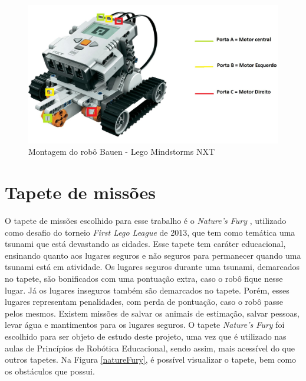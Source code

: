 \FloatBarrier
\begin{figure}[!h]
\centering
\includegraphics[keepaspectratio=true,scale=0.25]{figuras/bauen.jpg}
\caption{Montagem do robô Bauen - Lego Mindstorms NXT}
\label{bauen}
\end{figure}


\section{Tapete de missões} \label{tapeteDeMissoes}
O tapete de missões escolhido para esse trabalho é o \textit{Nature's Fury} \cite{challengeFury}, utilizado como desafio do torneio \textit{First Lego League} de 2013, que tem como temática uma tsunami que está devastando as cidades. Esse tapete tem caráter educacional, ensinando quanto aos lugares seguros e não seguros para permanecer quando uma tsunami está em atividade. Os lugares seguros durante uma tsunami, demarcados no tapete, são bonificados com uma pontuação extra, caso o robô fique nesse lugar. Já os lugares inseguros também são demarcados no tapete. Porém, esses lugares representam penalidades, com perda de pontuação, caso o robô passe pelos mesmos. Existem missões de salvar os animais de estimação, salvar pessoas, levar água e mantimentos para os lugares seguros.
O tapete \textit{Nature's Fury} foi escolhido para ser objeto de estudo deste projeto, uma vez que é utilizado nas aulas de Princípios de Robótica Educacional, sendo assim, mais acessível do que outros tapetes. Na Figura \ref{natureFury}, é possível visualizar o tapete, bem como os obstáculos que possui. 

